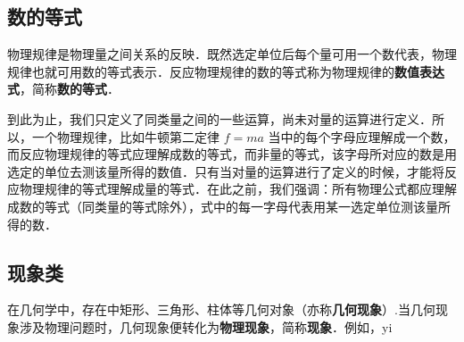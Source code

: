 
\subsection{数的等式}
物理规律是物理量之间关系的反映．既然选定单位后每个量可用一个数代表，物理规律也就可用数的等式表示．反应物理规律的数的等式称为物理规律的\textbf{数值表达式}，简称\textbf{数的等式}．

到此为止，我们只定义了同类量之间的一些运算，尚未对量的运算进行定义．所以，一个物理规律，比如牛顿第二定律 $f=ma$ 当中的每个字母应理解成一个数，而反应物理规律的等式应理解成数的等式，而非量的等式，该字母所对应的数是用选定的单位去测该量所得的数值．只有当对量的运算进行了定义的时候，才能将反应物理规律的等式理解成量的等式．在此之前，我们强调：所有物理公式都应理解成数的等式（同类量的等式除外），式中的每一字母代表用某一选定单位测该量所得的数．
\subsection{现象类}
在几何学中，存在中矩形、三角形、柱体等几何对象（亦称\textbf{几何现象}）.当几何现象涉及物理问题时，几何现象便转化为\textbf{物理现象}，简称\textbf{现象}．例如，yi